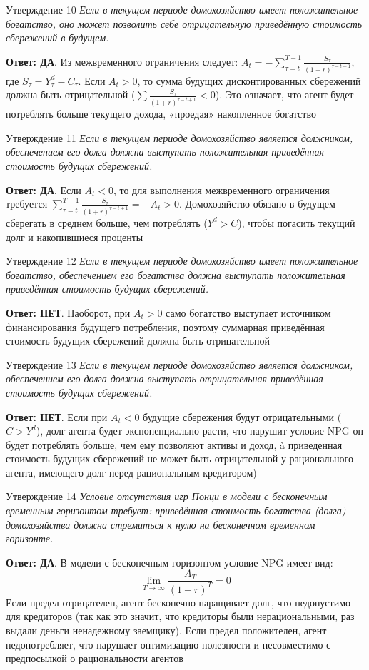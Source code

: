 \documentclass[10pt,a4paper]{article}
\newcommand{\qda}{\textbf{\color{yesgreen}Ответ: ДА}}
\newcommand{\qnet}{\textbf{\color{nored}Ответ: НЕТ}}
\newenvironment{answer}[2]{%
  \begin{qbox}{Утверждение #1}
  \textit{#2}\par\smallskip
}{%
  \end{qbox}\vspace{2pt}
}
\begin{document}
\begin{answer}{10}{Если в текущем периоде домохозяйство имеет положительное богатство, оно может позволить себе отрицательную приведённую стоимость сбережений в будущем.}
\qda. Из межвременного ограничения следует: $A_t = -\sum_{\tau=t}^{T-1} \frac{S_\tau}{(1+r)^{\tau-t+1}}$, где $S_\tau = Y_\tau^d - C_\tau$. Если $A_t > 0$, то сумма будущих дисконтированных сбережений должна быть отрицательной ($\sum \frac{S_\tau}{(1+r)^{\tau-t+1}} < 0$). Это означает, что агент будет потреблять больше текущего дохода, «проедая» накопленное богатство
\end{answer}

\begin{answer}{11}{Если в текущем периоде домохозяйство является должником, обеспечением его долга должна выступать положительная приведённая стоимость будущих сбережений.}
\qda. Если $A_t < 0$, то для выполнения межвременного ограничения требуется $\sum_{\tau=t}^{T-1} \frac{S_\tau}{(1+r)^{\tau-t+1}} = -A_t > 0$. Домохозяйство обязано в будущем сберегать в среднем больше, чем потреблять ($Y^d > C$), чтобы погасить текущий долг и накопившиеся проценты
\end{answer}

\begin{answer}{12}{Если в текущем периоде домохозяйство имеет положительное богатство, обеспечением его богатства должна выступать положительная приведённая стоимость будущих сбережений.}
\qnet. Наоборот, при $A_t > 0$ само богатство выступает источником финансирования будущего потребления, поэтому суммарная приведённая стоимость будущих сбережений должна быть отрицательной
\end{answer}

\begin{answer}{13}{Если в текущем периоде домохозяйство является должником, обеспечением его долга должна выступать отрицательная приведённая стоимость будущих сбережений.}
\qnet. Если при $A_t < 0$ будущие сбережения будут отрицательными ($C > Y^d$), долг агента будет экспоненциально расти, что нарушит условие NPG  он будет потреблять больше, чем ему позволяют активы и доход, à приведенная стоимость будущих сбережений не может быть отрицательной у рационального агента, имеющего долг перед рациональным кредитором)
\end{answer}

\begin{answer}{14}{Условие отсутствия игр Понци в модели с бесконечным временным горизонтом требует: приведённая стоимость богатства (долга) домохозяйства должна стремиться к нулю на бесконечном временном горизонте.}
\qda. В модели с бесконечным горизонтом условие NPG имеет вид:
\[
\lim_{T \to \infty} \frac{A_T}{(1+r)^T} = 0
\]
Если предел отрицателен, агент бесконечно наращивает долг, что недопустимо для кредиторов (так как это значит, что кредиторы были
нерациональными, раз выдали деньги ненадежному заемщику). Если предел положителен, агент недопотребляет, что нарушает оптимизацию полезности и  несовместимо с предпосылкой о рациональности агентов
\end{answer}
\end{document}
